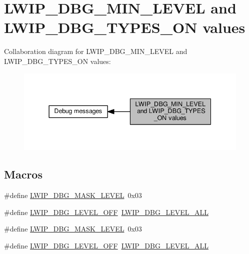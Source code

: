 \hypertarget{group__debugging__levels}{}\section{L\+W\+I\+P\+\_\+\+D\+B\+G\+\_\+\+M\+I\+N\+\_\+\+L\+E\+V\+EL and L\+W\+I\+P\+\_\+\+D\+B\+G\+\_\+\+T\+Y\+P\+E\+S\+\_\+\+ON values}
\label{group__debugging__levels}
Collaboration diagram for L\+W\+I\+P\+\_\+\+D\+B\+G\+\_\+\+M\+I\+N\+\_\+\+L\+E\+V\+EL and L\+W\+I\+P\+\_\+\+D\+B\+G\+\_\+\+T\+Y\+P\+E\+S\+\_\+\+ON values\+:
\nopagebreak
\begin{figure}[H]
\begin{center}
\leavevmode
\includegraphics[width=337pt]{group__debugging__levels}
\end{center}
\end{figure}
\subsection*{Macros}
\begin{DoxyCompactItemize}
\item 
\#define \hyperlink{group__debugging__levels_gad64836d29d071e1db104f49a01c951f1}{L\+W\+I\+P\+\_\+\+D\+B\+G\+\_\+\+M\+A\+S\+K\+\_\+\+L\+E\+V\+EL}~0x03
\item 
\#define \hyperlink{group__debugging__levels_gac2faac6759cbe02e4f1f9f27edbed78e}{L\+W\+I\+P\+\_\+\+D\+B\+G\+\_\+\+L\+E\+V\+E\+L\+\_\+\+O\+FF}~\hyperlink{group__debugging__levels_ga8ebaeb006b43f55897f3196b3617dc87}{L\+W\+I\+P\+\_\+\+D\+B\+G\+\_\+\+L\+E\+V\+E\+L\+\_\+\+A\+LL}
\item 
\#define \hyperlink{group__debugging__levels_gad64836d29d071e1db104f49a01c951f1}{L\+W\+I\+P\+\_\+\+D\+B\+G\+\_\+\+M\+A\+S\+K\+\_\+\+L\+E\+V\+EL}~0x03
\item 
\#define \hyperlink{group__debugging__levels_gac2faac6759cbe02e4f1f9f27edbed78e}{L\+W\+I\+P\+\_\+\+D\+B\+G\+\_\+\+L\+E\+V\+E\+L\+\_\+\+O\+FF}~\hyperlink{group__debugging__levels_ga8ebaeb006b43f55897f3196b3617dc87}{L\+W\+I\+P\+\_\+\+D\+B\+G\+\_\+\+L\+E\+V\+E\+L\+\_\+\+A\+LL}
\end{DoxyCompactItemize}
